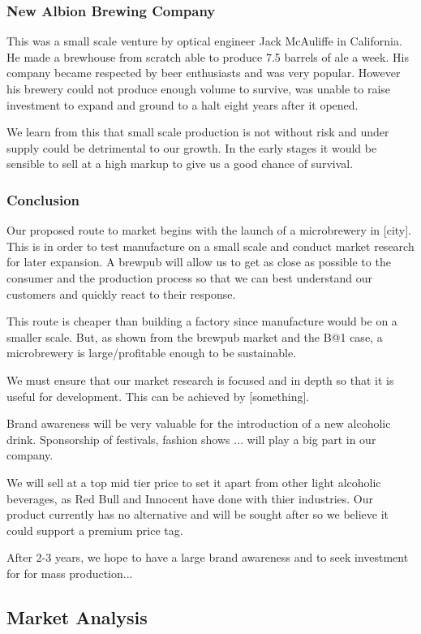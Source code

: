 \documentclass{article}
\begin{document}
\subsubsection{New Albion Brewing Company}
This was a small scale venture by optical engineer Jack McAuliffe in California.
He made a brewhouse from scratch able to produce 7.5 barrels of ale a week. His
company became respected by beer enthusiasts and was very popular. However his
brewery could not produce enough volume to survive, was unable to raise
investment to expand and ground to a halt eight years after it opened.

We learn from this that small scale production is not without risk and under supply 
could be detrimental to our growth. In the early stages it would be sensible to
sell at a high markup to give us a good chance of survival.

\subsubsection{Conclusion}
Our proposed route to market begins with the launch of a microbrewery in [city].
This is in order to test manufacture on a small scale and conduct market research for later expansion. A brewpub will allow us to get as close as possible to the consumer and the production process so that we can best understand our customers and quickly react to their response.

This route is cheaper than building a factory since manufacture would be on a
smaller scale. But, as shown from the brewpub market and the B@1 case, a microbrewery is large/profitable enough to be sustainable.

We must ensure that our market research is focused and in depth so that it is
useful for development. This can be achieved by [something].

Brand awareness will be very valuable for the introduction of a new alcoholic
drink. Sponsorship of festivals, fashion shows ... will play a big part in our
company.

We will sell at a top mid tier price to set it apart from other light alcoholic
beverages, as Red Bull and Innocent have done with thier industries. Our product
currently has no alternative and will be sought after so we believe it could support 
a premium price tag. 

After 2-3 years, we hope to have a large brand awareness and to seek investment for
for mass production... 

\subsection{Market Analysis}
\end{document}
